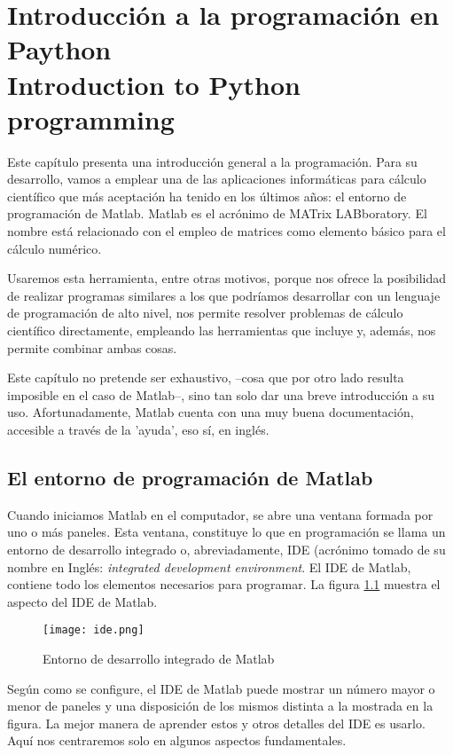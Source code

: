 \chapter{Introducción a la programación en Paython\\ Introduction to Python programming}  
Este capítulo presenta una introducción general a la programación. Para su desarrollo, vamos a emplear una de las aplicaciones informáticas para cálculo científico que más aceptación ha tenido en los últimos años: el entorno de programación de Matlab. Matlab es el acrónimo de MATrix LABboratory. El nombre está relacionado con el empleo de matrices como elemento básico para el cálculo numérico.

Usaremos esta herramienta, entre otras motivos, porque nos ofrece la posibilidad de realizar programas similares a los que podríamos desarrollar con un lenguaje de programación de alto nivel, nos permite resolver problemas de cálculo científico directamente, empleando las herramientas que incluye y, además, nos permite combinar ambas cosas.

Este capítulo no pretende ser exhaustivo, --cosa que por otro lado resulta imposible en el caso de Matlab--, sino tan solo dar una breve introducción a su uso. Afortunadamente, Matlab cuenta con una muy buena documentación, accesible a través de la 'ayuda', eso sí, en inglés. 



\section{El entorno de programación de Matlab}
Cuando iniciamos Matlab en el computador, se abre una ventana formada por uno o más paneles. Esta ventana, constituye lo que en programación se  llama un entorno de desarrollo integrado o, abreviadamente, IDE (acrónimo tomado de su nombre en Inglés: \emph{integrated development environment}. El IDE de Matlab, contiene todo los elementos necesarios para programar. La figura \ref{fig:ide} muestra el aspecto del IDE de Matlab.

\begin{figure}[h]
	\centering
		\texttt{[image: ide.png]}
	\caption{Entorno de desarrollo integrado de Matlab}
	\label{fig:ide}
\end{figure}

Según como se configure, el IDE de Matlab puede mostrar un número mayor o menor de paneles y una disposición de los mismos distinta a la mostrada en la figura. La mejor manera de aprender estos y otros detalles del IDE es usarlo. Aquí nos centraremos solo en algunos aspectos fundamentales.

